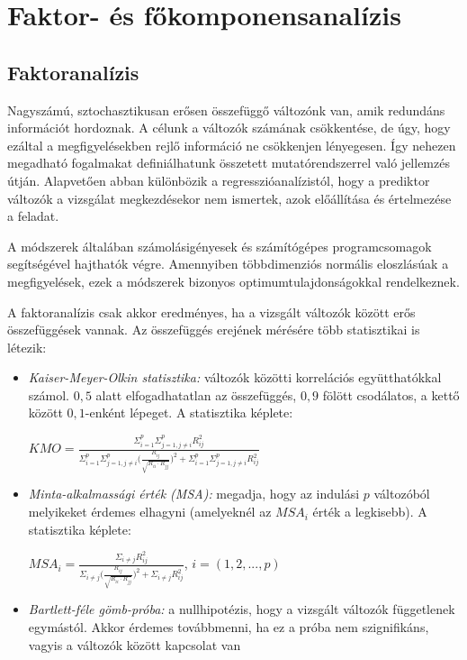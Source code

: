 \chapter{Faktor- és főkomponensanalízis}


\section{Faktoranalízis}

Nagyszámú, sztochasztikusan erősen összefüggő változónk van, amik redundáns információt hordoznak. A célunk a változók számának csökkentése, de úgy, hogy ezáltal a megfigyelésekben rejlő információ ne csökkenjen lényegesen. Így nehezen megadható fogalmakat definiálhatunk összetett mutatórendszerrel való jellemzés útján. Alapvetően abban különbözik a regresszióanalízistól, hogy a prediktor változók a vizsgálat megkezdésekor nem ismertek, azok előállítása és értelmezése a feladat.

A módszerek általában számolásigényesek és számítógépes programcsomagok segítségével hajthatók végre. Amennyiben többdimenziós normális eloszlásúak a megfigyelések, ezek a módszerek bizonyos optimumtulajdonságokkal rendelkeznek.

A faktoranalízis csak akkor eredményes, ha a vizsgált változók között erős összefüggések vannak. Az összefüggés erejének mérésére több statisztikai is létezik:
\begin{itemize}
\item \emph{Kaiser-Meyer-Olkin statisztika:} változók közötti korrelációs együtthatókkal számol. $0,5$ alatt elfogadhatatlan az összefüggés, $0,9$ fölött csodálatos, a kettő között $0,1$-enként lépeget. A statisztika képlete:

$KMO = \frac{\Sigma_{i=1}^p \Sigma_{j=1, j\neq i}^p R_{ij}^2}{\Sigma_{i=1}^p \Sigma_{j=1, j\neq i}^p \big(\frac{R_{ij}}{\sqrt{R_{ii}\cdot R_{jj}}} \big)^2 + \Sigma_{i=1}^p \Sigma_{j=1, j\neq i}^p R_{ij}^2}$

\item \emph{Minta-alkalmassági érték (MSA):} megadja, hogy az indulási $p$ változóból melyikeket érdemes elhagyni (amelyeknél az $MSA_i$ érték a legkisebb). A statisztika képlete:

$MSA_i = \frac{\Sigma_{i \neq j} R_{ij}^2}{\Sigma_{i \neq j} \big( \frac{R_{ij}}{\sqrt{R_{ii}\cdot R_{jj}}} \big)^2 + \Sigma_{i \neq j} R_{ij}^2}$, $i = (1,2,...,p)$

\item \emph{Bartlett-féle gömb-próba:} a nullhipotézis, hogy a vizsgált változók függetlenek egymástól. Akkor érdemes továbbmenni, ha ez a próba nem szignifikáns, vagyis a változók között kapcsolat van
\end{itemize}

